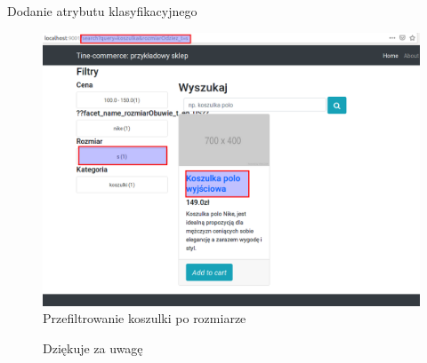 \documentclass[polish,xcolor=table,9pt,aspectratio=1610,hyperref={pdfpagemode=FullScreen}]{beamer}
\begin{document}
\begin{frame}{Dodanie atrybutu klasyfikacyjnego}
\begin{figure}
	\begin{center}
		\includegraphics[scale=0.25]{15.png}
	\end{center}
	\caption{{\color{black}Przefiltrowanie koszulki po rozmiarze}} 
\end{figure}
\end{frame}

\begin{frame}
\begin{figure}
	Dziękuje za uwagę
\end{figure}
\end{frame}
\end{document}
